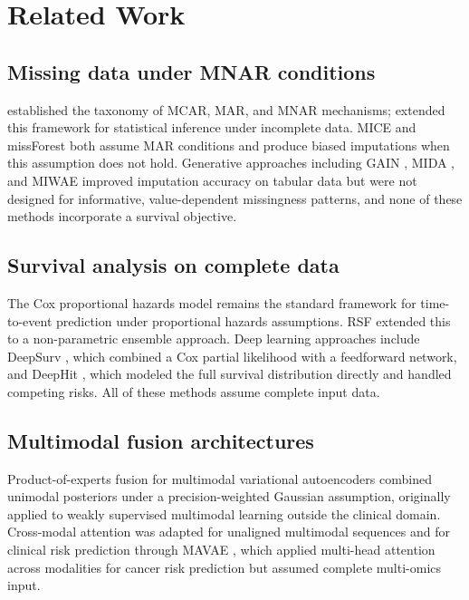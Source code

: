 \documentclass[final,3p,times,authoryear]{elsarticle}
\begin{document}
\section{Related Work}
\label{sec:related_work}

\subsection{Missing data under MNAR conditions}
\citet{rubin1976inference} established the taxonomy of MCAR, MAR, and MNAR mechanisms; \citet{little2019statistical} extended this framework for statistical inference under incomplete data. MICE \citep{buuren2011mice} and missForest \citep{stekhoven2012missforest} both assume MAR conditions and produce biased imputations when this assumption does not hold. Generative approaches including GAIN \citep{yoon2018gain}, MIDA \citep{gondara2018mida}, and MIWAE \citep{mattei2019miwae} improved imputation accuracy on tabular data but were not designed for informative, value-dependent missingness patterns, and none of these methods incorporate a survival objective.

\subsection{Survival analysis on complete data}
The Cox proportional hazards model \citep{cox1972regression} remains the standard framework for time-to-event prediction under proportional hazards assumptions. RSF \citep{ishwaran2008random} extended this to a non-parametric ensemble approach. Deep learning approaches include DeepSurv \citep{katzman2018deepsurv}, which combined a Cox partial likelihood with a feedforward network, and DeepHit \citep{lee2018deephit}, which modeled the full survival distribution directly and handled competing risks. All of these methods assume complete input data.

\subsection{Multimodal fusion architectures}
Product-of-experts fusion for multimodal variational autoencoders \citep{wu2018multimodal} combined unimodal posteriors under a precision-weighted Gaussian assumption, originally applied to weakly supervised multimodal learning outside the clinical domain. Cross-modal attention \citep{vaswani2017attention} was adapted for unaligned multimodal sequences \citep{tsai2019multimodal} and for clinical risk prediction through MAVAE \citep{li2023mavae}, which applied multi-head attention across modalities for cancer risk prediction but assumed complete multi-omics input.
\end{document}
